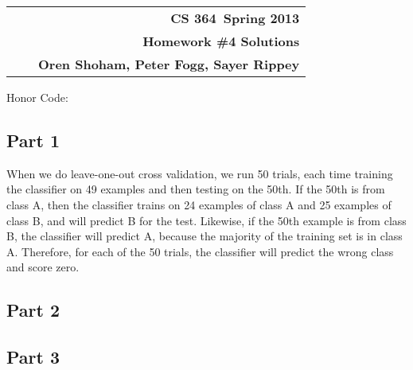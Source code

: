 \documentclass[11pt]{article}
\makeatletter
\newcommand{\course}{CS 364}
\newcommand{\semester}{Spring 2013}
\newcommand{\hwk}{Homework \#4 Solutions}
\newcommand{\student}{Oren Shoham, Peter Fogg, Sayer Rippey}
\renewcommand\maketitle{
\begin{center}
\begin{tabular*}{6.44in}{l @{\extracolsep{\fill}}c r}
\bfseries  &  & \bfseries \course ~\semester \\
\bfseries&  & \bfseries  \hwk  \\
\bfseries   &   &  \bfseries \student \\ 
\end{tabular*}
\end{center} }
\makeatother
\begin{document}
\maketitle
\thispagestyle{plain}


\noindent Honor Code: 

\subsection*{Part 1}
When we do leave-one-out cross validation, we run 50 trials, each time training the classifier on 49  examples and then testing on the 50th. If the 50th is from class A, then the classifier trains on 24 examples of class A and 25 examples of class B, and will predict B for the test. Likewise, if the 50th example is from class B, the classifier will predict A, because the majority of the training set is in class A. Therefore, for each of the 50 trials, the classifier will predict the wrong class and score zero.
\subsection*{Part 2}

\subsection*{Part 3}
\end{document}

